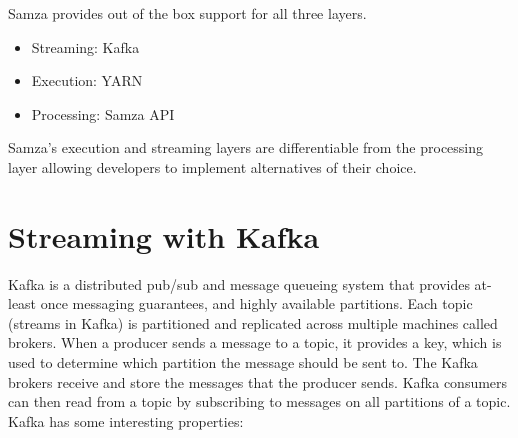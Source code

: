 \documentclass[9pt,twocolumn,twoside]{../../styles/osajnl}
\begin{document}
Samza provides out of the box support for all three layers.

\begin{itemize}
\renewcommand{\labelitemi}{\scriptsize$\square$} 
\item Streaming: Kafka
\item Execution: YARN
\item Processing: Samza API
\end{itemize}




Samza’s execution and streaming layers are differentiable from the processing
layer allowing developers to implement alternatives of their choice.

\section{Streaming with Kafka}
Kafka is a distributed pub/sub and message queueing system that provides
at-least once messaging guarantees, and highly available partitions. Each topic
(streams in Kafka) is partitioned and replicated across multiple machines called
brokers. When a producer sends a message to a topic, it provides a key, which is
used to determine which partition the message should be sent to. The Kafka
brokers receive and store the messages that the producer sends. Kafka consumers
can then read from a topic by subscribing to messages on all partitions of a
topic.\cite{paper2}
Kafka has some interesting properties:
\end{document}
